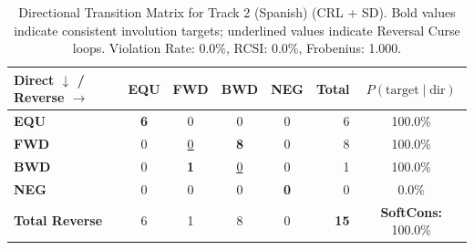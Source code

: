 \begin{table}[ht]
\centering
\small
\begin{tabular}{l|cccc|r|c}
\toprule
\textbf{Direct $\downarrow$ / Reverse $\rightarrow$} & \textbf{EQU} & \textbf{FWD} & \textbf{BWD} & \textbf{NEG} & \textbf{Total} & \textbf{$P(\text{target} \mid \text{dir})$} \\
\midrule
\textbf{EQU} & \textbf{6} & 0 & 0 & 0 & 6 & 100.0\% \\
\textbf{FWD} & 0 & \underline{0} & \textbf{8} & 0 & 8 & 100.0\% \\
\textbf{BWD} & 0 & \textbf{1} & \underline{0} & 0 & 1 & 100.0\% \\
\textbf{NEG} & 0 & 0 & 0 & \textbf{0} & 0 & 0.0\% \\
\midrule
\textbf{Total Reverse} & 6 & 1 & 8 & 0 & \textbf{15} & \textbf{SoftCons:} 100.0\% \\
\bottomrule
\end{tabular}
\caption{Directional Transition Matrix for Track 2 (Spanish) (CRL + SD). Bold values indicate consistent involution targets; underlined values indicate Reversal Curse loops. Violation Rate: 0.0\%, RCSI: 0.0\%, Frobenius: 1.000.}
\label{tab:transition_matrix}
\end{table}